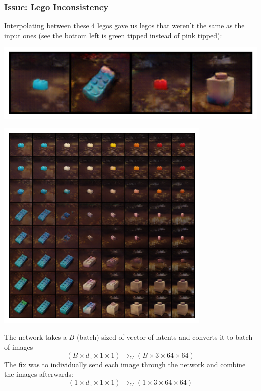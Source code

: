 \documentclass[]{article}
\begin{document}
\newpage
\subsubsection*{Issue: Lego Inconsistency}
Interpolating between these 4 legos gave us legos that weren't the same as the input ones
(see the bottom left is green tipped instead of pink tipped):
\begin{center}
\includegraphics[scale=0.75]{./imgs/seed_69,0,23,42,62_legos}
\end{center}

\begin{center}
\includegraphics[scale=1]{./imgs/seed_69,0,23,42,62_wrong}
\end{center}

The network takes a $B$ (batch) sized of vector of latents and
converts it to batch of images
$$
(B \times d_z \times 1 \times 1)
\rightarrow_{G}
(B \times 3 \times 64 \times 64)
$$
The fix was to individually send each image through the network and combine the images
afterwards: 
$$
(1 \times d_z \times 1 \times 1)
\rightarrow_{G}
(1 \times 3 \times 64 \times 64)
$$
\end{document}
